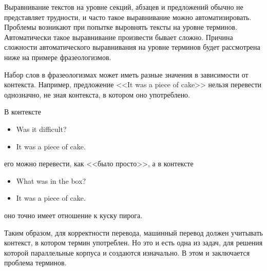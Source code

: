 Выравнивание текстов на уровне секций, абзацев и предложений обычно не представляет трудности, и часто такое выравнивание можно автоматизировать.
Проблемы возникают при попытке выровнять тексты на уровне терминов.
Автоматически такое выравнивание произвести бывает сложно.
Причина сложности автоматического выравнивания на уровне терминов будет рассмотрена ниже на примере фразеологизмов.

Набор слов в фразеологизмах может иметь разные значения в зависимости от контекста.
Например, предложение <<It was a piece of cake>> нельзя перевести однозначно, не зная контекста, в котором оно употреблено.

В контексте 
\begin{itemize}
    \item Was it difficult?
    \item It was a piece of cake.
\end{itemize}
его можно перевести, как <<было просто>>, а в контексте
\begin{itemize}
    \item What was in the box?
    \item It was a piece of cake.
\end{itemize}
оно точно имеет отношение к куску пирога.

Таким образом, для корректности перевода, машинный перевод должен учитывать контекст, в котором термин употреблен.
Но это и есть одна из задач, для решения которой параллельные корпуса и создаются изначально.
В этом и заключается проблема терминов.



